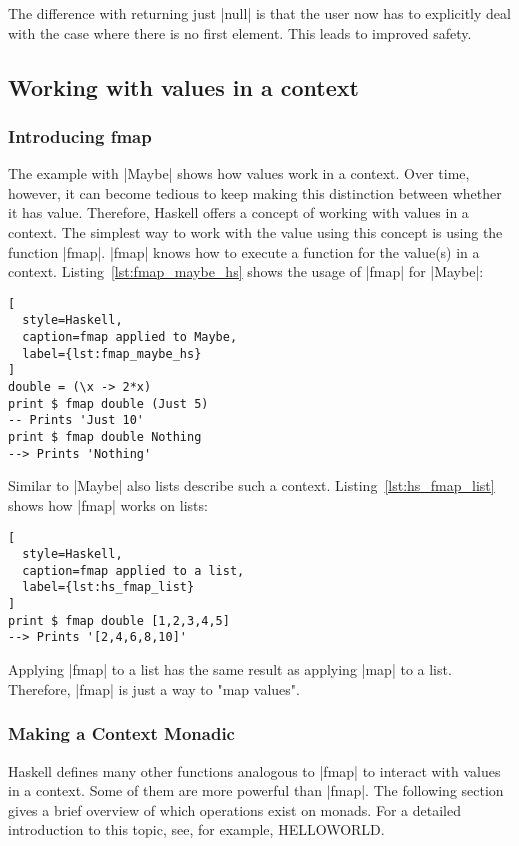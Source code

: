 The difference with returning just |null| is that the user now has to
explicitly deal with the case where there is no first element. This leads to
improved safety.

\subsection{Working with values in a context} %
\label{sub:Working with values in a context}
\subsubsection{Introducing fmap} %
\label{subsub:Introducing fmap}
The example with |Maybe| shows how values work in a context. Over time,
however, it can become tedious to keep making this distinction between whether
it has value. Therefore, Haskell offers a concept of working with values in a
context. The simplest way to work with the value using this concept is using
the function |fmap|. |fmap| knows how to execute a function for the value(s) in
a context. Listing~\ref{lst:fmap_maybe_hs} shows the usage of |fmap| for
|Maybe|:

\begin{lstlisting}[
  style=Haskell,
  caption=fmap applied to Maybe,
  label={lst:fmap_maybe_hs}
]
double = (\x -> 2*x)
print $ fmap double (Just 5)
-- Prints 'Just 10' 
print $ fmap double Nothing
--> Prints 'Nothing'
\end{lstlisting}

Similar to |Maybe| also lists describe such a context.
Listing~\ref{lst:hs_fmap_list} shows how |fmap| works on lists:

\begin{lstlisting}[
  style=Haskell,
  caption=fmap applied to a list,
  label={lst:hs_fmap_list}
]
print $ fmap double [1,2,3,4,5]
--> Prints '[2,4,6,8,10]'
\end{lstlisting}

Applying |fmap| to a list has the same result as applying |map| to a list.
Therefore, |fmap| is just a way to "map values".

\subsubsection{Making a Context Monadic} %
\label{sec:Making a Context Monadic}
Haskell defines many other functions analogous to |fmap| to interact with
values in a context. Some of them are more powerful than |fmap|. The following
section gives a brief overview of which operations exist on monads. For a
detailed introduction to this topic, see, for example, HELLOWORLD. \\

